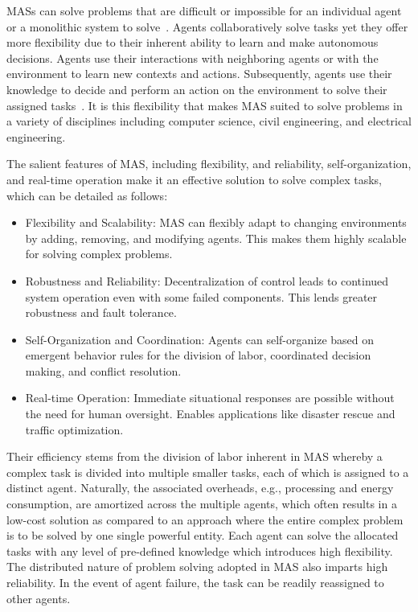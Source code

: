 \documentclass[acmsmall,nonacm]{acmart}
\begin{document}

        MASs can solve problems that are difficult or impossible for an individual agent or a monolithic system to solve~\cite{divband2022intelligent}. Agents collaboratively solve tasks yet they offer more flexibility due to their inherent ability to learn and make autonomous decisions. Agents use their interactions with neighboring agents or with the environment to learn new contexts and actions. Subsequently, agents use their knowledge to decide and perform an action on the environment to solve their assigned tasks~\cite{fischer2021loop}. It is this flexibility that makes MAS suited to solve problems in a variety of disciplines including computer science, civil engineering, and electrical engineering. 

        The salient features of MAS, including flexibility, and reliability, self-organization, and real-time operation make it an effective solution to solve complex tasks, which can be detailed as follows: 
        \begin{itemize}
            \item Flexibility and Scalability: MAS can flexibly adapt to changing environments by adding, removing, and modifying agents. This makes them highly scalable for solving complex problems.
            \item Robustness and Reliability: Decentralization of control leads to continued system operation even with some failed components. This lends greater robustness and fault tolerance.
            \item Self-Organization and Coordination: Agents can self-organize based on emergent behavior rules for the division of labor, coordinated decision making, and conflict resolution.
            \item Real-time Operation: Immediate situational responses are possible without the need for human oversight. Enables applications like disaster rescue and traffic optimization.
        \end{itemize}
        Their efficiency stems from the division of labor inherent in MAS whereby a complex task is divided into multiple smaller tasks, each of which is assigned to a distinct agent. Naturally, the associated overheads, e.g., processing and energy consumption, are amortized across the multiple agents, which often results in a low-cost solution as compared to an approach where the entire complex problem is to be solved by one single powerful entity. Each agent can solve the allocated tasks with any level of pre-defined knowledge which introduces high flexibility. The distributed nature of problem solving adopted in MAS also imparts high reliability. In the event of agent failure, the task can be readily reassigned to other agents.
\end{document}
